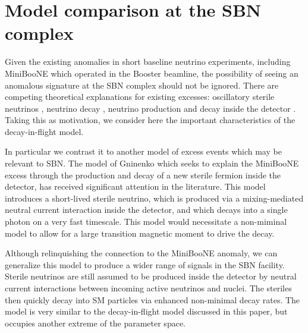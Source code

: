 \documentclass[11pt, a4paper]{article}
\newcommand{\newtext}[2]{\textcolor{#1}{\ul{#2}}}
\begin{document}
\section{\label{sec:modelcomp}Model comparison at the SBN complex}

Given the existing anomalies in short baseline neutrino experiments, including
MiniBooNE which operated in the Booster beamline, the possibility of seeing an
anomalous signature at the SBN complex should not be ignored. There are
competing theoretical explanations for existing excesses: oscillatory sterile
neutrinos \cite{Everyone...}, neutrino decay \cite{Pascoli, Schwetz}, neutrino
production and decay inside the detector \cite{Gninenko, Meloni, Us?}. Taking
this as motivation, we consider here the important characteristics of the
decay-in-flight model.

In particular we contrast it to another model of excess events which may be
relevant to SBN.
%
The model of Gninenko \cite{Gninenko:2009ks,Gninenko:2010pr} which seeks to
explain the MiniBooNE excess through the production and decay of a new sterile
fermion inside the detector, has received significant attention in the
literature. This model introduces a short-lived sterile neutrino, which is
produced via a mixing-mediated neutral current interaction inside the detector,
and which decays into a single photon on a very fast timescale. This model
would necessitate a non-miminal model to allow for a large transition magnetic
moment to drive the decay. 

Although relinquishing the connection to the MiniBooNE anomaly, we can
generalize this model to produce a wider range of signals in the SBN facility.
Sterile neutrinos are still assumed to be produced inside the detector by
neutral current interactions between incoming active neutrinos and nuclei. The
steriles then quickly decay into SM particles via enhanced non-minimal decay
rates.
%
The model is very similar to the decay-in-flight model discussed in this paper,
but occupies another extreme of the parameter space.


% 
% 
% 
\end{document}
